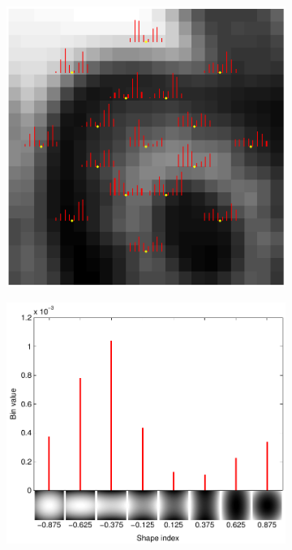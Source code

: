 \documentclass[thesis.tex]{subfiles}
\begin{document}
\begin{figure}[p]
   	\centering
	\begin{subfigure}[t]{0.65\textwidth}
	    \includegraphics[width=\textwidth]{img/cellHistFigureSi.pdf}
	    \caption{}
   	    \label{fig:cellHistFigureSiCfeature}
    \end{subfigure}
    \begin{subfigure}[t]{0.65\textwidth}
    	\centering
    	\includegraphics[width=\textwidth]{img/cellHistFigureSiExample.pdf}

\end{subfigure}
\end{figure}
\end{document}
